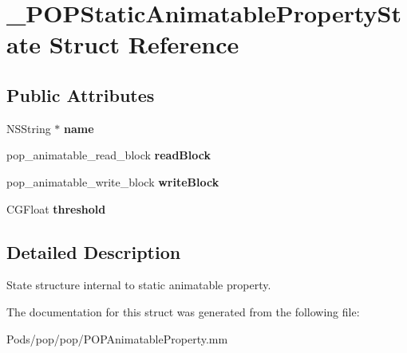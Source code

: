 \hypertarget{struct___p_o_p_static_animatable_property_state}{}\section{\+\_\+\+P\+O\+P\+Static\+Animatable\+Property\+State Struct Reference}
\label{struct___p_o_p_static_animatable_property_state}
\subsection*{Public Attributes}
\begin{DoxyCompactItemize}
\item 
\mbox{\label{struct___p_o_p_static_animatable_property_state_af04b3e1f283d31757ff0e965d6754688}} 
N\+S\+String $\ast$ {\bfseries name}
\item 
\mbox{\label{struct___p_o_p_static_animatable_property_state_ae71e9087ba09508611ecccf018dc431f}} 
pop\+\_\+animatable\+\_\+read\+\_\+block {\bfseries read\+Block}
\item 
\mbox{\label{struct___p_o_p_static_animatable_property_state_a43acf56c0671720458a39ff2ae2482f3}} 
pop\+\_\+animatable\+\_\+write\+\_\+block {\bfseries write\+Block}
\item 
\mbox{\label{struct___p_o_p_static_animatable_property_state_abf59da41114c105ab05276f81391dfa3}} 
C\+G\+Float {\bfseries threshold}
\end{DoxyCompactItemize}


\subsection{Detailed Description}
State structure internal to static animatable property. 

The documentation for this struct was generated from the following file\+:\begin{DoxyCompactItemize}
\item 
Pods/pop/pop/P\+O\+P\+Animatable\+Property.\+mm\end{DoxyCompactItemize}

